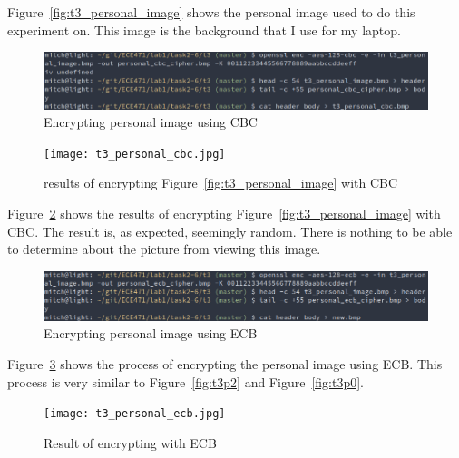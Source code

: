 \documentclass[12pt]{article}
\begin{document}
Figure~\ref{fig:t3_personal_image} shows the personal image used to do this experiment on. This image
is the background that I use for my laptop.

\begin{figure}[H]
    \begin{center}
        \includegraphics[scale=0.5]{t3p5.png}
    \end{center}{}
    \caption{Encrypting personal image using CBC}
    \label{fig:t3p5}
\end{figure}


\begin{figure}[H]
    \begin{center}
        \texttt{[image: t3\_personal\_cbc.jpg]}
    \end{center}{}
    \caption{results of encrypting Figure~\ref{fig:t3_personal_image} with CBC}
    \label{fig:t3_personal_cbc}
\end{figure}

Figure~\ref{fig:t3_personal_cbc} shows the results of encrypting
Figure~\ref{fig:t3_personal_image} with CBC. The result is, as expected, seemingly random.
There is nothing to be able to determine about the picture from viewing this image.

\begin{figure}[H]
    \begin{center}
        \includegraphics[scale=0.5]{t3p4.png}
    \end{center}{}
    \caption{Encrypting personal image using ECB}
    \label{fig:t3p4}
\end{figure}

Figure~\ref{fig:t3p4} shows the process of encrypting the personal image using ECB. This process is
very similar to Figure~\ref{fig:t3p2} and Figure~\ref{fig:t3p0}.

\begin{figure}[H]
    \begin{center}
        \texttt{[image: t3\_personal\_ecb.jpg]}
    \end{center}{}
    \caption{Result of encrypting with ECB}
    \label{fig:t3_personal_ecb}
\end{figure}
\end{document}
